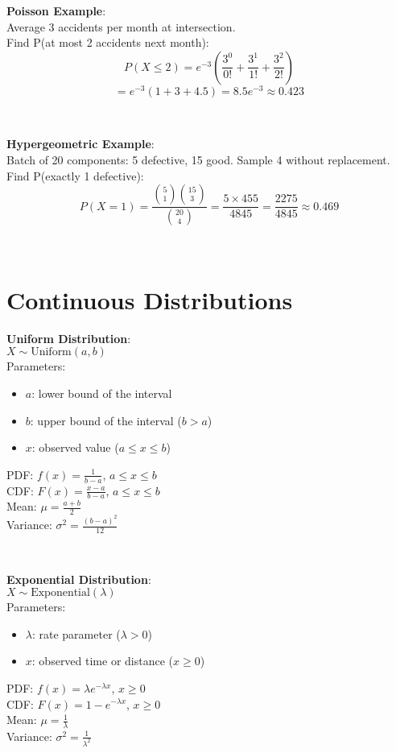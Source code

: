\documentclass{article}
\newenvironment{cheatformula}[1][Title]{
    \begin{minipage}{\linewidth}
    \textbf{#1}:\\
}{
    \end{minipage}\\[2ex]
}
\begin{document}
\begin{multicols*}{2}
\begin{cheatformula}[Poisson Example]
    Average 3 accidents per month at intersection.\\
    Find P(at most 2 accidents next month):
    $$P(X \leq 2) = e^{-3}\left(\frac{3^0}{0!} + \frac{3^1}{1!} + \frac{3^2}{2!}\right)$$
    $$= e^{-3}(1 + 3 + 4.5) = 8.5e^{-3} \approx 0.423$$
\end{cheatformula}

\begin{cheatformula}[Hypergeometric Example]
    Batch of 20 components: 5 defective, 15 good. Sample 4 without replacement.\\
    Find P(exactly 1 defective):
    $$P(X = 1) = \frac{\binom{5}{1}\binom{15}{3}}{\binom{20}{4}} = \frac{5 \times 455}{4845} = \frac{2275}{4845} \approx 0.469$$
\end{cheatformula}

\section{Continuous Distributions}

\begin{cheatformula}[Uniform Distribution]
    $X \sim \text{Uniform}(a,b)$\\
    Parameters:
    \begin{itemize}
        \item $a$: lower bound of the interval
        \item $b$: upper bound of the interval ($b > a$)
        \item $x$: observed value ($a \leq x \leq b$)
    \end{itemize}
    PDF: $f(x) = \frac{1}{b-a}$, $a \leq x \leq b$\\
    CDF: $F(x) = \frac{x-a}{b-a}$, $a \leq x \leq b$\\
    Mean: $\mu = \frac{a+b}{2}$\\
    Variance: $\sigma^2 = \frac{(b-a)^2}{12}$
\end{cheatformula}

\begin{cheatformula}[Exponential Distribution]
    $X \sim \text{Exponential}(\lambda)$\\
    Parameters:
    \begin{itemize}
        \item $\lambda$: rate parameter ($\lambda > 0$)
        \item $x$: observed time or distance ($x \geq 0$)
    \end{itemize}
    PDF: $f(x) = \lambda e^{-\lambda x}$, $x \geq 0$\\
    CDF: $F(x) = 1 - e^{-\lambda x}$, $x \geq 0$\\
    Mean: $\mu = \frac{1}{\lambda}$\\
    Variance: $\sigma^2 = \frac{1}{\lambda^2}$\\
    

\end{cheatformula}
\end{multicols*}
\end{document}
